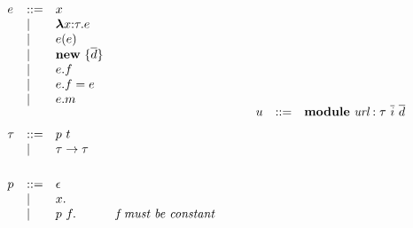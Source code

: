 \begin{figure}
\centering
\[
\begin{array}{llll}

e    & ::= & x \\
     & \mathrel{\mid} & \boldsymbol\lambda x{:}\tau . e \\
     & \mathrel{\mid} & e(e) \\
     & \mathrel{\mid} & \textbf{new}~ \{ \overline{d} \}\\
     & \mathrel{\mid} & e.f \\
     & \mathrel{\mid} & e.f = e \\
     & \mathrel{\mid} & e.m \\
\\[1ex]

\tau & ::= & p ~ t\\
     & \mathrel{\mid} & \tau \rightarrow \tau \\
\\[1ex]
	 
p	 & ::= & \epsilon\\
     & \mathrel{\mid} & x. \\
     & \mathrel{\mid} & p ~ f. & \textit{f must be constant}\\
\\[1ex]
	 
\end{array}
\begin{array}{lll}
~~~~
\end{array}
\begin{array}{lll}

u   & ::= & \textbf{module}~ \textit{url} : \tau ~\overline{i} ~\overline{d}\\
\\[1ex]




\end{array}\]
\end{figure}
